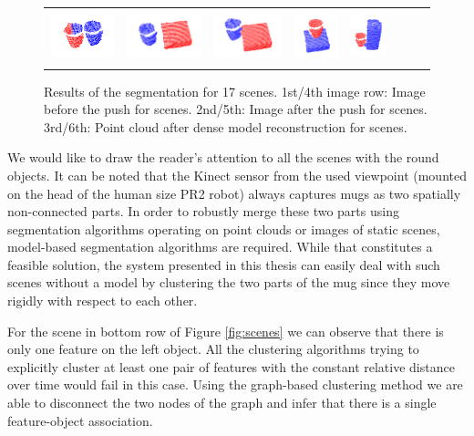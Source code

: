 \begin{figure}[h!]
\begin{tabular}{cccccccc}
    \includegraphics[height=1.5cm]{pictures/133.png}&
    \includegraphics[height=1.5cm]{pictures/143.png}&
    \includegraphics[height=1.5cm]{pictures/153.png}&
    \includegraphics[height=1.5cm]{pictures/163.png}&
    \includegraphics[height=1.5cm]{pictures/173.png}\\
    \end{tabular}
    	\caption{Results  of the  segmentation for  17  scenes.  1st/4th
          image row:  Image before  the push  for scenes.   2nd/5th:
          Image after the push for scenes.  3rd/6th: Point cloud
          after dense model reconstruction for scenes.}
    \label{fig:evaluation1}
\end{figure}

We would  like to draw the  reader's attention to all  the scenes with
the round objects. 
It can be noted that
the Kinect sensor from the used viewpoint (mounted on the head of the human size PR2 robot) always
captures mugs as two spatially non-connected parts.
In order to robustly merge these two parts using segmentation
algorithms operating on point clouds or images of static scenes, 
model-based segmentation algorithms are required. While that constitutes a feasible solution,
the system presented in this
thesis can easily deal with such scenes without a model by clustering the two
parts of the mug since they move rigidly with respect to each other.

 For  the scene in  bottom row  of Figure \ref{fig:scenes}  we can  observe that
 there is only one feature on the left object.  All   the  clustering  algorithms  trying  to
 explicitly cluster  at least one  pair of features with  the constant
 relative  distance over  time would  fail  in this  case.  Using  the
 graph-based clustering method we are able to disconnect the two nodes
 of  the  graph  and infer  that  there  is a single feature-object association.



